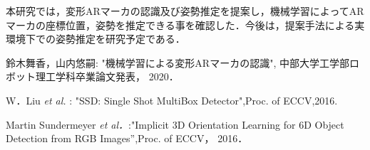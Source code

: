 \documentclass{jsarticle}
\begin{document}
本研究では，変形ARマーカの認識及び姿勢推定を提案し，機械学習によってARマーカの座標位置，姿勢を推定できる事を確認した．今後は，提案手法による実環境下での姿勢推定を研究予定である．

%
%
%

\begin{thebibliography}{1}

{\scriptsize
{}
鈴木舞香，山内悠嗣: "機械学習による変形ARマーカの認識", 中部大学工学部ロボット理工学科卒業論文発表， 2020． }

{\scriptsize
{}
W．Liu {\em et al. }: "SSD: Single Shot MultiBox Detector",Proc. of ECCV,2016.}

{\scriptsize 
{}
Martin Sundermeyer {\em et al．}:"Implicit 3D Orientation Learning for 6D Object Detection from RGB Images'',Proc. of ECCV， 2016．}

\end{thebibliography}
\end{document}
